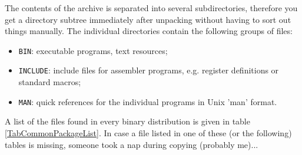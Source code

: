 \documentclass[12pt,twoside]{report}
\begin{document}
The contents of the archive is separated into several subdirectories,
therefore you get a directory subtree immediately after unpacking without
having to sort out things manually.  The individual directories contain
the following groups of files:
\begin{itemize}
\item{{\tt BIN}: executable programs, text resources;}
\item{{\tt INCLUDE}: include files for assembler programs, e.g. register
      definitions or standard macros;}
\item{{\tt MAN}: quick references for the individual programs in Unix
      'man' format.}
\end{itemize}
A list of the files found in every binary distribution is given in table
\ref{TabCommonPackageList}.  In case a file listed in one of these (or the
following) tables is missing, someone took a nap during copying (probably
me)...
\end{document}
